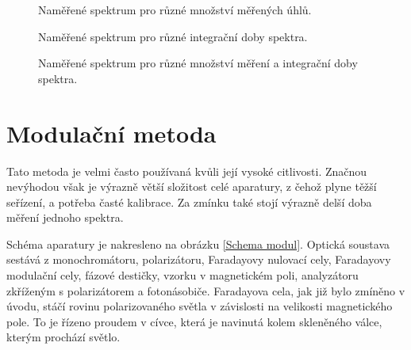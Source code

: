 \begin{figure}

\caption{Naměřené spektrum pro různé množství měřených úhlů.}
\label{TPE1}
\end{figure}

\begin{figure}

\caption{Naměřené spektrum pro různé integrační doby spektra.}
\label{TPE2}
\end{figure}

\begin{figure}

\caption{Naměřené spektrum pro různé množství měření a integrační doby spektra.}
\label{TPE3}
\end{figure}


\section{Modulační metoda}
Tato metoda je velmi často používaná kvůli její vysoké citlivosti. Značnou nevýhodou však je výrazně větší složitost celé aparatury, z čehož plyne těžší seřízení, a potřeba časté kalibrace. Za zmínku také stojí výrazně delší doba měření jednoho spektra.

Schéma aparatury je nakresleno na obrázku \ref{Schema modul}. Optická soustava sestává z monochromátoru, polarizátoru, Faradayovy nulovací cely, Faradayovy modulační cely, fázové destičky, vzorku v magnetickém poli, analyzátoru zkříženým s polarizátorem a fotonásobiče. 
Faradayova cela, jak již bylo zmíněno v úvodu, stáčí rovinu polarizovaného světla v závislosti na velikosti magnetického pole. To je řízeno proudem v cívce, která je navinutá kolem skleněného válce, kterým prochází světlo.

